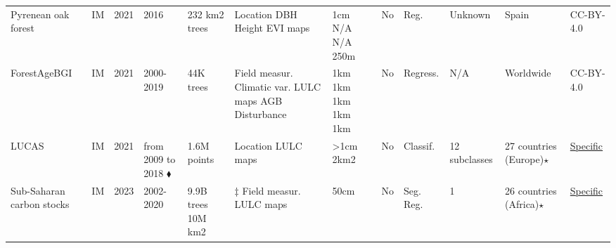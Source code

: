 \documentclass{CUP-JNL-DTM}%
\theoremstyle{definition}
\numberwithin{equation}{section}
\begin{document}
\begin{table*}[ht]
{\begin{fntable}
\begin{adjustwidth}{-0.8cm}{}
\begin{tabular}{p{1.4cm} | p{0.3cm} | p{0.4cm} | p{1cm} | p{1.4cm} | p{1.4cm} : p{1.5cm} | p{0.4cm} | p{0.7cm} | p{1cm} | p{1cm} | p{1.1cm}}
Pyrenean oak forest	\cite{perez-luque_land-use_2021} & IM & 2021 & 2016 & 232 km2  trees & Location \newline DBH \newline Height \newline EVI maps & 1cm \newline N/A \newline N/A \newline 250m & No & Reg. & Unknown & Spain & CC-BY-4.0 \\

ForestAgeBGI \cite{besnard_mapping_2021} & IM & 2021 & 2000-2019 & 44K trees & Field measur. \newline Climatic var. \newline LULC maps \newline AGB \newline Disturbance & 1km \newline 1km \newline 1km \newline 1km \newline 1km & No & Regress. & N/A & Worldwide & CC-BY-4.0 \\

LUCAS \cite{european_commission_statistical_office_of_the_european_union_lucas_2021} & IM & 2021 & from 2009 to 2018 $\blacklozenge$ & 1.6M points & Location \newline LULC maps & >1cm \newline 2km2 & No & Classif. & 12  subclasses & 27 countries (Europe)$\star$ & \href{https://esdac.jrc.ec.europa.eu/projects/LUCAS/Documents/LUCAS_SOIL_LIC_AGR_final_for_web.pdf}{Specific} \\

Sub-Saharan carbon stocks \cite{tucker_sub-continental-scale_2023} & IM & 2023 & 2002-2020 & 9.9B trees \newline 10M km2 & $\ddagger$ Field measur. \newline LULC maps & 50cm \newline 50cm & No & Seg. \newline Reg. & 1	& 26 countries (Africa)$\star$ & \href{https://daac.ornl.gov/about/#citation_policy}{Specific} \\

\bottomrule


\end{tabular}
\end{adjustwidth}
\end{fntable}}
\end{table*}
\end{document}
